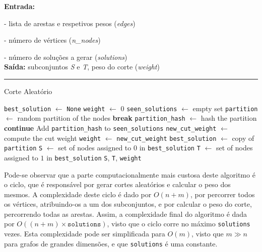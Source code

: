 \documentclass[mirror, portugues]{revdetua}
\begin{document}
\begin{algorithm}[H]
\raggedright
\textbf{Entrada:}

- lista de arestas e respetivos pesos (\textit{edges})

- número de vértices (\textit{n\_nodes})

- número de soluções a gerar (\textit{solutions})\\
\textbf{Saída:} subconjuntos \textit{S} e \textit{T}, peso do corte (\textit{weight}) \\
\hrule 
\caption{Corte Aleatório}
\begin{algorithmic}[1]
    \State \texttt{best\_solution} $\gets$ \texttt{None}
    \State \texttt{weight} $\gets$ 0
    \State \texttt{seen\_solutions} $\gets$ empty set
        \State \texttt{partition} $\gets$ random partition of the nodes
            \State \textbf{break}
        \EndIf
        \State \texttt{partition\_hash} $\gets$ hash the partition
            \State \textbf{continue}
        \EndIf
        \State Add \texttt{partition\_hash} to \texttt{seen\_solutions}
        \State \texttt{new\_cut\_weight} $\gets$ compute the cut weight
            \State \texttt{weight} $\gets$ \texttt{new\_cut\_weight}
            \State \texttt{best\_solution} $\gets$ copy of \texttt{partition}
        \EndIf
    \EndFor
    \State \texttt{S} $\gets$ set of nodes assigned to $0$ in \texttt{best\_solution}
    \State \texttt{T} $\gets$ set of nodes assigned to $1$ in \texttt{best\_solution}
    \Return \texttt{S}, \texttt{T}, \texttt{weight}
\end{algorithmic}
\end{algorithm}
    
Pode-se observar que a parte computacionalmente mais custosa deste algoritmo é o ciclo, que é responsável por gerar cortes aleatórios e calcular o peso dos mesmos. A complexidade deste ciclo é dado por $O(n + m)$, por percorrer todos os vértices, atribuindo-os a um dos subconjuntos, e por calcular o peso do corte, percorrendo todas as arestas. Assim, a complexidade final do algoritmo é dada por $O((n + m) \times \texttt{solutions})$, visto que o ciclo corre no máximo \texttt{solutions} vezes. Esta complexidade pode ser simplificada para $O(m)$, visto que $m \gg n$ para grafos de grandes dimensões, e que \texttt{solutions} é uma constante.
\end{document}
